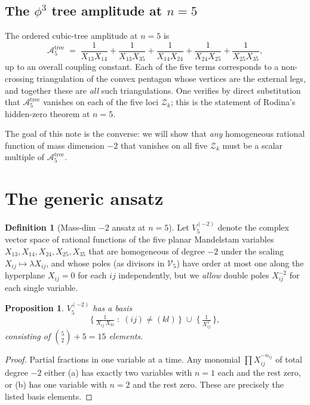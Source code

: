 \documentclass[11pt]{article}
\theoremstyle{plain}
\newtheorem{proposition}[theorem]{Proposition}
\theoremstyle{definition}
\newtheorem{definition}[theorem]{Definition}
\newcommand{\cA}{\mathcal{A}}
\newcommand{\cV}{\mathcal{V}}
\newcommand{\cZ}{\mathcal{Z}}
\begin{document}
\subsection{The $\phi^3$ tree amplitude at $n=5$}

The ordered cubic-tree amplitude at $n=5$ is
\begin{equation}
\cA_5^{\text{tree}}
\;=\; \frac{1}{X_{13} X_{14}} + \frac{1}{X_{13} X_{35}} + \frac{1}{X_{14} X_{24}}
    + \frac{1}{X_{24} X_{25}} + \frac{1}{X_{25} X_{35}},
\label{eq:tree}
\end{equation}
up to an overall coupling constant. Each of the five terms corresponds to a non-crossing
triangulation of the convex pentagon whose vertices are the external legs, and
together these are \emph{all} such triangulations. One verifies by direct substitution
that $\cA_5^{\text{tree}}$ vanishes on each of the five loci $\cZ_k$; this is the
statement of Rodina's hidden-zero theorem at $n=5$.

\bigskip

The goal of this note is the converse: we will show that \emph{any} homogeneous
rational function of mass dimension $-2$ that vanishes on all five $\cZ_k$ must be
a scalar multiple of $\cA_5^{\text{tree}}$.

\section{The generic ansatz}

\begin{definition}[Mass-dim $-2$ ansatz at $n=5$]
Let $V_5^{(-2)}$ denote the complex vector space of rational functions of the five
planar Mandelstam variables $X_{13}, X_{14}, X_{24}, X_{25}, X_{35}$ that are
homogeneous of degree $-2$ under the scaling $X_{ij} \mapsto \lambda X_{ij}$, and whose
poles (as divisors in $\cV_5$) have order at most one along the hyperplane $X_{ij} = 0$
for each $ij$ independently, but we \emph{allow} double poles $X_{ij}^{-2}$ for each
single variable.
\end{definition}

\begin{proposition}\label{prop:dim}
$V_5^{(-2)}$ has a basis
\[
\Big\{\, \tfrac{1}{X_{ij}\, X_{kl}} \;:\; (ij) \ne (kl) \,\Big\}
\;\cup\;
\Big\{\, \tfrac{1}{X_{ij}^2} \,\Big\},
\]
consisting of $\binom{5}{2} + 5 = 15$ elements.
\end{proposition}

\begin{proof}
Partial fractions in one variable at a time. Any monomial
$\prod X_{ij}^{-n_{ij}}$ of total degree $-2$ either (a) has exactly two
variables with $n = 1$ each and the rest zero, or (b) has one variable with
$n = 2$ and the rest zero. These are precisely the listed basis elements.
\end{proof}
\end{document}
